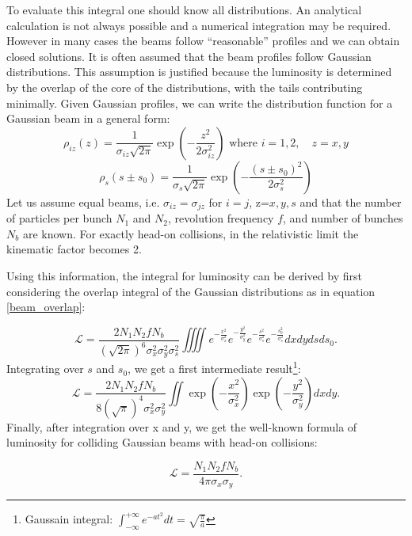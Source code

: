 To evaluate this integral one should know all distributions. An analytical calculation is not always possible and a numerical integration may be required. However in many cases the beams follow ``reasonable” profiles and we can obtain closed solutions. It is often assumed that the beam profiles follow Gaussian distributions. This assumption is justified because the luminosity is determined by the overlap of the core of the distributions, with the tails contributing minimally.
Given Gaussian profiles, we can write the distribution function for a Gaussian beam in a general form:
\begin{equation}
\rho_{iz}(z) =\frac{1}{\sigma_{iz}\sqrt{2\pi}} \exp\left( -\frac{z^2}{2 \sigma_{iz}^2} \right) \text{ where } i=1,2, \quad z=x,y
\end{equation}
\begin{equation}
\rho_{s}(s\pm s_0) =\frac{1}{\sigma_s\sqrt{2\pi}} \exp\left( -\frac{(s\pm s_0)^2}{2 \sigma_s^2} \right)
\end{equation}
Let us assume equal beams, i.e.  $\sigma_{iz} = \sigma_{jz}$ for $i=j$, z=$x,y,s$ and that the number of particles per bunch $N_1$ and $N_2$, revolution frequency $f$, and number of bunches $N_b$ are known. For exactly head-on collisions, in the relativistic limit the kinematic factor becomes 2.

Using this information, the integral for luminosity can be derived by first considering the overlap integral of the Gaussian distributions as in equation \eqref{beam_overlap}:

\begin{equation}
\mathcal{L} = \frac{2  N_1 N_2 f N_b}{(\sqrt{2\pi})^6 \sigma_x^2\sigma_y^2\sigma_s^2}\iiiint e^{-\frac{x^2}{ \sigma_x^2}} e^{-\frac{y^2}{\sigma_y^2}} e^{-\frac{s^2}{\sigma_s^2}}e^{-\frac{s_0^2}{\sigma_s^2}}dxdydsds_0.
\end{equation}
Integrating over $s$ and $s_0$, we get a first intermediate result\footnote{Gaussain integral: $\int_{-\infty}^{+\infty}e^{-at^2}dt = \sqrt{\tfrac{\pi}{a}}$}:
\begin{equation}
    \mathcal{L} = \frac{2  N_1 N_2 f N_b}{8(\sqrt{\pi})^4 \sigma_x^2\sigma_y^2}\iint \exp\left(-\frac{x^2}{\sigma_x^2}\right) \exp\left(-\frac{y^2}{\sigma_y^2}\right) dxdy .\label{spec_lumi_gaus}
\end{equation}
Finally, after integration over x and y, we get the well-known formula of luminosity for colliding Gaussian beams with head-on collisions:

\begin{equation}
\mathcal{L} = \frac{N_1  N_2  f N_b}{4 \pi  \sigma_x \sigma_y}.
\end{equation}

